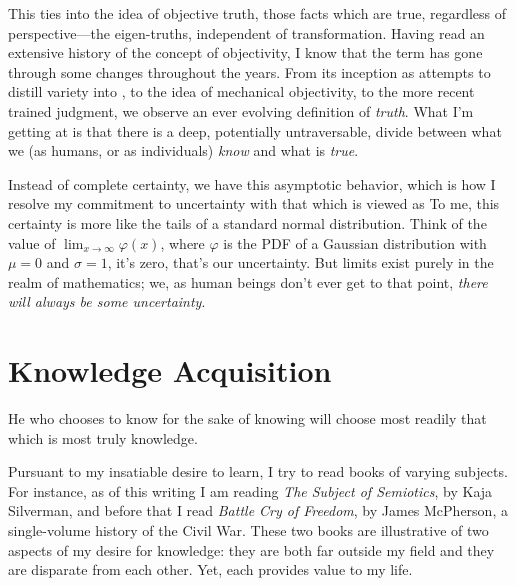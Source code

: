 \documentclass[../butidigress.tex]{subfiles}
\begin{document}
This ties into the idea of objective truth, those facts which are true, regardless of perspective---the eigen-truths, independent of transformation.
Having read an extensive history of the concept of objectivity, I know that the term has gone through some changes throughout the years\parencite{objectivity}.
From its inception as attempts to distill variety into , to the idea of mechanical objectivity, to the more recent trained judgment, we observe an ever evolving definition of \emph{truth}.
What I'm getting at is that there is a deep, potentially untraversable, divide between what we (as humans, or as individuals) \emph{know} and what is \emph{true}.

Instead of complete certainty, we have this asymptotic behavior, which is how I resolve my commitment to uncertainty with that which is viewed as 
To me, this certainty is more like the tails of a standard normal distribution.
Think of the value of $\lim_{x\to\infty}\varphi(x)$, where $\varphi$ is the PDF of a Gaussian distribution with $\mu = 0$ and $\sigma = 1$, it's zero, that's our uncertainty.
But limits exist purely in the realm of mathematics; we, as human beings don't ever get to that point, \emph{there will always be some uncertainty}.

\section{Knowledge Acquisition}
\epigraph{He who chooses to know for the sake of knowing will choose most readily that which is most truly knowledge.}{}

Pursuant to my insatiable desire to learn, I try to read books of varying subjects.
For instance, as of this writing I am reading \textit{The Subject of Semiotics}, by Kaja Silverman, and before that I read \textit{Battle Cry of Freedom}, by James McPherson, a single-volume history of the Civil War.
These two books are illustrative of two aspects of my desire for knowledge: they are both far outside my field and they are disparate from each other.
Yet, each provides value to my life.
\end{document}
